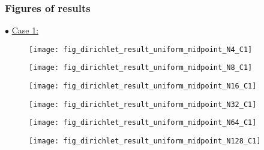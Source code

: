 \documentclass{article}
\begin{document}
	\subsubsection{Figures of results}
	\noindent$\bullet$ \underline{Case 1:}
	\begin{figure}[H]
		\centering	\texttt{[image: fig\_dirichlet\_result\_uniform\_midpoint\_N4\_C1]}
	\end{figure}
	\begin{figure}[H]
		\centering	\texttt{[image: fig\_dirichlet\_result\_uniform\_midpoint\_N8\_C1]}
	\end{figure}
	\begin{figure}[H]
		\centering	\texttt{[image: fig\_dirichlet\_result\_uniform\_midpoint\_N16\_C1]}
	\end{figure}
	\begin{figure}[H]
		\centering	\texttt{[image: fig\_dirichlet\_result\_uniform\_midpoint\_N32\_C1]}
	\end{figure}
	\begin{figure}[H]
		\centering	\texttt{[image: fig\_dirichlet\_result\_uniform\_midpoint\_N64\_C1]}
	\end{figure}
	\begin{figure}[H]
		\centering	\texttt{[image: fig\_dirichlet\_result\_uniform\_midpoint\_N128\_C1]}
	\end{figure}
\end{document}
